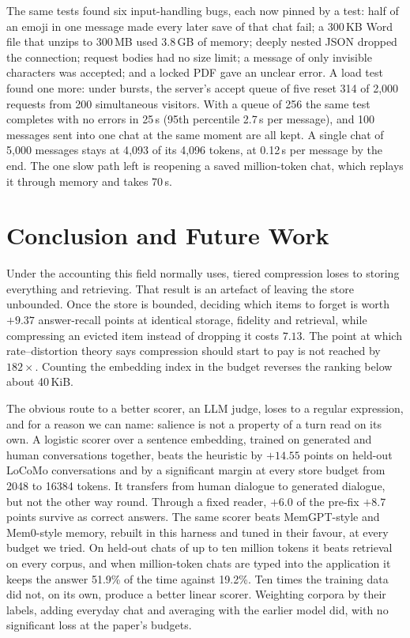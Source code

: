 The same tests found six input-handling bugs, each now pinned by a test: half
of an emoji in one message made every later save of that chat fail; a 300\,KB
Word file that unzips to 300\,MB used 3.8\,GB of memory; deeply nested JSON
dropped the connection; request bodies had no size limit; a message of only
invisible characters was accepted; and a locked PDF gave an unclear error. A
load test found one more: under bursts, the server's accept queue of five
reset 314 of 2{,}000 requests from 200 simultaneous visitors. With a queue
of 256 the same test completes with no errors in 25\,s (95th percentile
2.7\,s per message), and 100 messages sent into one chat at the same moment
are all kept. A single chat of 5{,}000 messages stays at 4{,}093 of its
4{,}096 tokens, at 0.12\,s per message by the end. The one slow path left is
reopening a saved million-token chat, which replays it through memory and
takes 70\,s.

\section{Conclusion and Future Work}
\label{sec:conclusion}

Under the accounting this field normally uses, tiered compression loses to
storing everything and retrieving. That result is an artefact of leaving the
store unbounded. Once the store is bounded, deciding which items to forget is
worth $+9.37$ answer-recall points at identical storage, fidelity and
retrieval, while compressing an evicted item instead of dropping it costs
$7.13$. The point at which rate--distortion theory \cite{cover2006elements}
says compression should start to pay is not reached by $182\times$. Counting
the embedding index in the budget reverses the ranking below about 40\,KiB.

The obvious route to a better scorer, an LLM judge, loses to a regular
expression, and for a reason we can name: salience is not a property of a
turn read on its own. A logistic scorer over a sentence embedding, trained on
generated and human conversations together, beats the heuristic by $+14.55$
points on held-out LoCoMo conversations and by a significant margin at every
store budget from 2048 to 16384 tokens. It transfers from human dialogue to
generated dialogue, but not the other way round. Through a fixed reader,
$+6.0$ of the pre-fix $+8.7$ points survive as correct answers. The same
scorer beats MemGPT-style and Mem0-style memory, rebuilt in this harness and
tuned in their favour, at every budget we tried. On held-out chats of up to
ten million tokens it beats retrieval on every corpus, and when million-token
chats are typed into the application it keeps the answer 51.9\% of the time
against 19.2\%. Ten times the training data did not, on its own, produce a
better linear scorer. Weighting corpora by their labels, adding everyday chat
and averaging with the earlier model did, with no significant loss at the
paper's budgets.


